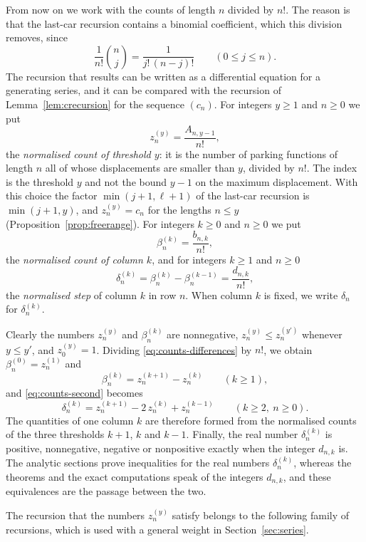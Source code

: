 \documentclass{amsart}
\theoremstyle{definition}
\theoremstyle{remark}
\numberwithin{equation}{section}
\begin{document}
From now on we work with the counts of length $n$ divided by $n!$. The
reason is that the last-car recursion contains a binomial coefficient, which
this division removes, since
\[
\frac{1}{n!}\binom{n}{j}=\frac{1}{j!\,(n-j)!}\qquad(0\le j\le n).
\]
The recursion that results can be written as a differential equation for a
generating series, and it can be compared with the recursion of
Lemma~\ref{lem:crecursion} for the sequence $(c_n)$. For integers $y\ge1$
and $n\ge0$ we put
\[
z^{(y)}_n=\frac{A_{n,y-1}}{n!},
\]
the \emph{normalised count of threshold $y$}: it is
the number of parking functions of length $n$ all of whose displacements are
smaller than $y$, divided by $n!$. The index is the threshold $y$ and not the
bound $y-1$ on the maximum displacement. With this choice the factor
$\min(j+1,\ell+1)$ of the last-car recursion is $\min(j+1,y)$, and
$z^{(y)}_n=c_n$ for the lengths $n\le y$ (Proposition~\ref{prop:freerange}). For
integers $k\ge0$ and $n\ge0$ we put
\[
\beta^{(k)}_n=\frac{b_{n,k}}{n!},
\]
the \emph{normalised count of column $k$}, and for integers $k\ge1$ and
$n\ge0$
\[
\delta^{(k)}_n=\beta^{(k)}_n-\beta^{(k-1)}_n=\frac{d_{n,k}}{n!},
\]
the \emph{normalised step} of column $k$ in row $n$. When column
$k$ is fixed, we write $\delta_n$ for $\delta^{(k)}_n$.

Clearly the numbers
$z^{(y)}_n$ and $\beta^{(k)}_n$ are nonnegative, $z^{(y)}_n\le z^{(y')}_n$
whenever $y\le y'$, and $z^{(y)}_0=1$. Dividing
\eqref{eq:counts-differences} by $n!$, we obtain
$\beta^{(0)}_n=z^{(1)}_n$ and
\begin{equation}\label{eq:counts-column}
\beta^{(k)}_n=z^{(k+1)}_n-z^{(k)}_n\qquad(k\ge1),
\end{equation}
and \eqref{eq:counts-second} becomes
\begin{equation}\label{eq:counts-step}
\delta^{(k)}_n=z^{(k+1)}_n-2\,z^{(k)}_n+z^{(k-1)}_n\qquad(k\ge2,\ n\ge0).
\end{equation}
The quantities of one column $k$ are therefore formed from the normalised
counts of the three thresholds $k+1$, $k$ and $k-1$. Finally, the real
number $\delta^{(k)}_n$ is positive, nonnegative, negative or nonpositive
exactly when the integer $d_{n,k}$ is. The analytic sections prove
inequalities for the real numbers $\delta^{(k)}_n$, whereas the theorems and
the exact computations speak of the integers $d_{n,k}$, and these equivalences
are the passage between the two.

The recursion that the numbers $z^{(y)}_n$ satisfy belongs to the following
family of recursions, which is used with a general weight in
Section~\ref{sec:series}.
\end{document}
